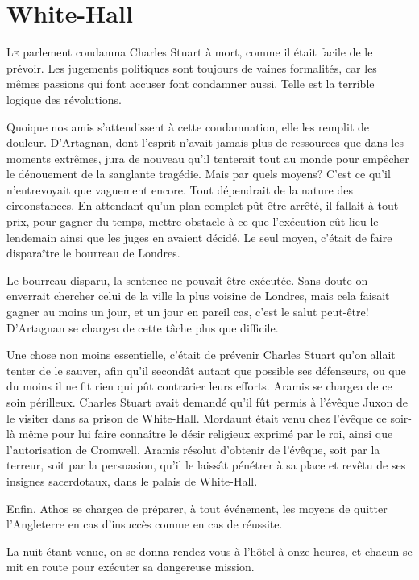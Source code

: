 \chapter{White-Hall}

\lettrine{L}{e} parlement condamna Charles Stuart à mort, comme il était facile de le prévoir. Les jugements politiques sont toujours de vaines formalités, car les mêmes passions qui font accuser font condamner aussi. Telle est la terrible logique des révolutions.

Quoique nos amis s'attendissent à cette condamnation, elle les remplit de douleur. D'Artagnan, dont l'esprit n'avait jamais plus de ressources que dans les moments extrêmes, jura de nouveau qu'il tenterait tout au monde pour empêcher le dénouement de la sanglante tragédie. Mais par quels moyens? C'est ce qu'il n'entrevoyait que vaguement encore. Tout dépendrait de la nature des circonstances. En attendant qu'un plan complet pût être arrêté, il fallait à tout prix, pour gagner du temps, mettre obstacle à ce que l'exécution eût lieu le lendemain ainsi que les juges en avaient décidé. Le seul moyen, c'était de faire disparaître le bourreau de Londres.

Le bourreau disparu, la sentence ne pouvait être exécutée. Sans doute on enverrait chercher celui de la ville la plus voisine de Londres, mais cela faisait gagner au moins un jour, et un jour en pareil cas, c'est le salut peut-être! D'Artagnan se chargea de cette tâche plus que difficile.

Une chose non moins essentielle, c'était de prévenir Charles Stuart qu'on allait tenter de le sauver, afin qu'il secondât autant que possible ses défenseurs, ou que du moins il ne fit rien qui pût contrarier leurs efforts. Aramis se chargea de ce soin périlleux. Charles Stuart avait demandé qu'il fût permis à l'évêque Juxon de le visiter dans sa prison de White-Hall. Mordaunt était venu chez l'évêque ce soir-là même pour lui faire connaître le désir religieux exprimé par le roi, ainsi que l'autorisation de Cromwell. Aramis résolut d'obtenir de l'évêque, soit par la terreur, soit par la persuasion, qu'il le laissât pénétrer à sa place et revêtu de ses insignes sacerdotaux, dans le palais de White-Hall.

Enfin, Athos se chargea de préparer, à tout événement, les moyens de quitter l'Angleterre en cas d'insuccès comme en cas de réussite.

La nuit étant venue, on se donna rendez-vous à l'hôtel à onze heures, et chacun se mit en route pour exécuter sa dangereuse mission.


